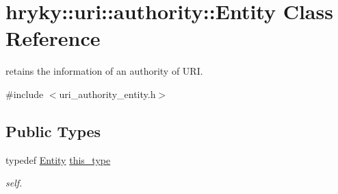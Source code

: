 \hypertarget{classhryky_1_1uri_1_1authority_1_1_entity}{\section{hryky\-:\-:uri\-:\-:authority\-:\-:Entity Class Reference}
\label{classhryky_1_1uri_1_1authority_1_1_entity}
}


retains the information of an authority of U\-R\-I.  




{\ttfamily \#include $<$uri\-\_\-authority\-\_\-entity.\-h$>$}

\subsection*{Public Types}
\begin{DoxyCompactItemize}
\item 
\hypertarget{classhryky_1_1uri_1_1authority_1_1_entity_a72978dd715c7bda0b5b1015967ecc5fe}{typedef \hyperlink{classhryky_1_1uri_1_1authority_1_1_entity}{Entity} \hyperlink{classhryky_1_1uri_1_1authority_1_1_entity_a72978dd715c7bda0b5b1015967ecc5fe}{this\-\_\-type}}\label{classhryky_1_1uri_1_1authority_1_1_entity_a72978dd715c7bda0b5b1015967ecc5fe}

\begin{DoxyCompactList}\small\item\em self. \end{DoxyCompactList}\end{DoxyCompactItemize}
